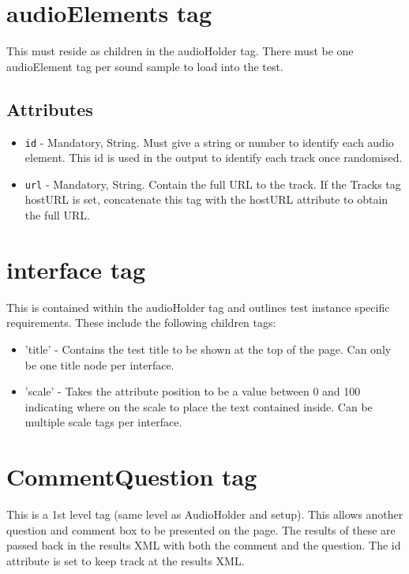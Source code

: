 \documentclass{article}
\begin{document}
\section{audioElements tag}

This must reside as children in the audioHolder tag. There must be one audioElement tag per sound sample to load into the test.

\subsection{Attributes}
\begin{itemize}
\item \texttt{id} - Mandatory, String. Must give a string or number to identify each audio element. This id is used in the output to identify each track once randomised.
\item \texttt{url} - Mandatory, String. Contain the full URL to the track. If the Tracks tag hostURL is set, concatenate this tag with the hostURL attribute to obtain the full URL.
\end{itemize}

\section{interface tag}

This is contained within the audioHolder tag and outlines test instance specific requirements. These include the following children tags:
\begin{itemize}
\item 'title' - Contains the test title to be shown at the top of the page. Can only be one title node per interface.
\item 'scale' - Takes the attribute position to be a value between 0 and 100 indicating where on the scale to place the text contained inside. Can be multiple scale tags per interface.
\end{itemize}

\section {CommentQuestion tag}

This is a 1st level tag (same level as AudioHolder and setup). This allows another question and comment box to be presented on the page. The results of these are passed back in the results XML with both the comment and the question. The id attribute is set to keep track at the results XML.
\end{document}
